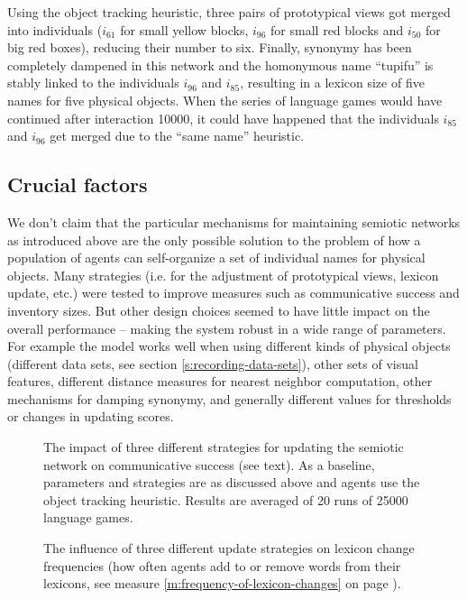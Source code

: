 Using the object tracking heuristic, three pairs of prototypical views
got merged into individuals ($i_{61}$ for small yellow blocks,
$i_{96}$ for small red blocks and $i_{50}$ for big red boxes),
reducing their number to six. Finally, synonymy has been completely
dampened in this network and the homonymous name ``tupifu'' is stably
linked to the individuals $i_{96}$ and $i_{85}$, resulting in a
lexicon size of five names for five physical objects. When the series
of language games would have continued after interaction 10000, it
could have happened that the individuals $i_{85}$ and $i_{96}$ get
merged due to the ``same name'' heuristic.


\subsection{Crucial factors}

We don't claim that the particular mechanisms for maintaining semiotic
networks as introduced above are the only possible solution to the
problem of how a population of agents can self-organize a set of
individual names for physical objects. Many strategies (i.e. for the
adjustment of prototypical views, lexicon update, etc.) were tested to
improve measures such as communicative success and inventory
sizes. But other design choices seemed to have little impact on the
overall performance -- making the system robust in a wide range of
parameters. For example the model works well when using different
kinds of physical objects (different data sets, see section
\ref{s:recording-data-sets}), other sets of visual features, different
distance measures for nearest neighbor computation, other mechanisms
for damping synonymy, and generally different values for thresholds or
changes in updating scores.

\begin{figure}[p]
  \caption{The impact of three different strategies for updating the
    semiotic network on communicative success (see text). As a
    baseline, parameters and strategies are as discussed above and
    agents use the object tracking heuristic. Results are averaged of
    20 runs of 25000 language games.}
  \label{f:gng-update-stragegies-vs-success}
\end{figure}


\begin{figure}[p]
  \caption{The influence of three different update strategies on
    lexicon change frequencies (how often agents add to or remove
    words from their lexicons, see measure
    \ref{m:frequency-of-lexicon-changes} on page
    \pageref{m:frequency-of-lexicon-changes}).}
  \label{f:gng-update-stragegies-vs-lexicon-change}
\end{figure}

